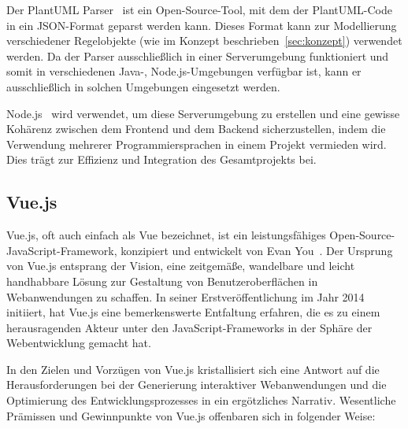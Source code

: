 Der PlantUML Parser~\cite{plantUMLParser} ist ein Open-Source-Tool,
mit dem der PlantUML-Code in ein JSON-Format geparst werden kann. Dieses Format kann zur Modellierung verschiedener
Regelobjekte (wie im Konzept beschrieben~\ref{sec:konzept}) verwendet werden. Da der Parser ausschließlich in einer
Serverumgebung funktioniert und somit in verschiedenen Java-, Node.js-Umgebungen verfügbar ist, kann er
ausschließlich in solchen Umgebungen eingesetzt werden.

Node.js~\cite{Node} wird verwendet, um diese Serverumgebung zu erstellen und eine gewisse Kohärenz zwischen dem
Frontend und dem Backend sicherzustellen, indem die Verwendung mehrerer Programmiersprachen in einem Projekt vermieden
wird. Dies trägt zur Effizienz und Integration des Gesamtprojekts bei.

\subsection{Vue.js}

Vue.js, oft auch einfach als Vue bezeichnet, ist  ein leistungsfähiges Open-Source-JavaScript-Framework, konzipiert und
entwickelt von Evan You~\cite{vue}. Der Ursprung von Vue.js entsprang der Vision, eine zeitgemäße, wandelbare und leicht
handhabbare Lösung zur Gestaltung von Benutzeroberflächen in Webanwendungen zu schaffen. In seiner Erstveröffentlichung
im Jahr 2014 initiiert, hat Vue.js eine bemerkenswerte Entfaltung erfahren, die es zu einem herausragenden Akteur unter
den JavaScript-Frameworks in der Sphäre der Webentwicklung gemacht hat.

In den Zielen und Vorzügen von Vue.js kristallisiert sich eine Antwort auf die Herausforderungen bei der Generierung
interaktiver Webanwendungen und die Optimierung des Entwicklungsprozesses in ein ergötzliches Narrativ. Wesentliche
Prämissen und Gewinnpunkte von Vue.js offenbaren sich in folgender Weise:

